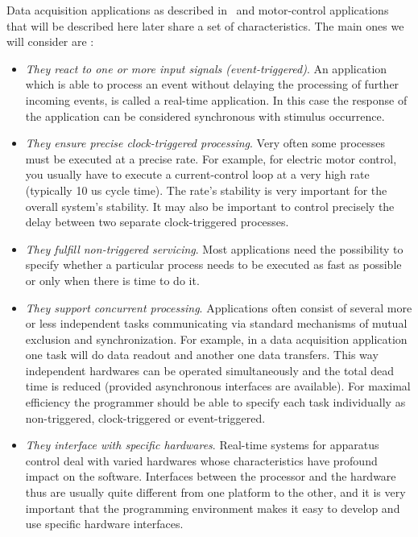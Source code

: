 \documentclass[10pt]{report}
\begin{document}
Data acquisition applications as described in~\cite{Delchini:95} and
motor-control applications that will be described here later
share a set of characteristics. The main ones we will consider
are :

\begin{itemize}

\item {\em They react to one or more input signals (event-triggered)}. An
  application which is able to process an event without delaying
  the processing of further incoming events, is called a
  real-time application. In this case the response of the
  application can be considered synchronous with stimulus
  occurrence.

\item {\em They ensure precise clock-triggered processing}. Very often
  some processes must be executed at a precise rate. For example,
  for electric motor control, you usually have to execute a
  current-control loop at a very high rate (typically 10 us cycle
  time). The rate's stability is very important for the overall
  system's stability. It may also be important to control
  precisely the delay between two separate clock-triggered
  processes.

\item {\em They fulfill non-triggered servicing}. Most applications need
  the possibility to specify whether a particular process needs
  to be executed as fast as possible or only when
  there is time to do it.

\item {\em They support concurrent processing}. Applications often consist
  of several more or less independent tasks communicating via
  standard mechanisms of mutual exclusion and synchronization.
  For example, in a data acquisition application one task will do
  data readout and another one data transfers. This way
  independent hardwares can be operated simultaneously and the
  total dead time is reduced (provided asynchronous interfaces
  are available). For maximal efficiency the programmer should be
  able to specify each task individually as non-triggered,
  clock-triggered or event-triggered.

\item {\em They interface with specific hardwares}. Real-time systems for
  apparatus control deal with varied hardwares whose
  characteristics have profound impact on the software.
  Interfaces between the processor and the hardware thus are
  usually quite different from one platform to the other, and it
  is very important that the programming environment makes it
  easy to develop and use specific hardware interfaces.

\end{itemize}
\end{document}
